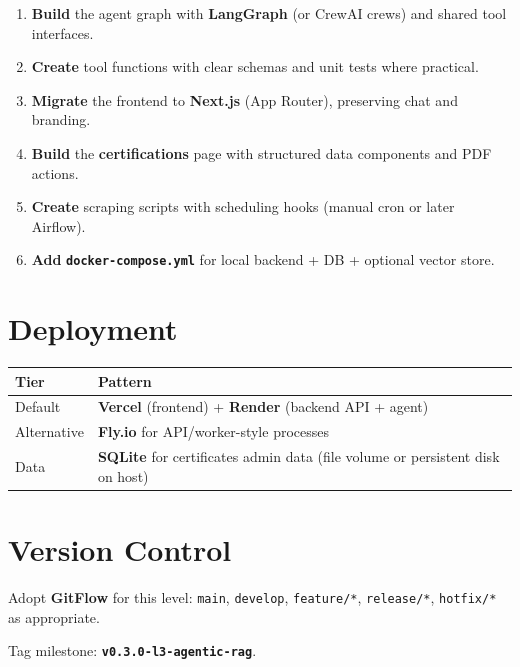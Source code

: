 \documentclass{article}
\begin{document}
\begin{enumerate}[leftmargin=*]
  \item \textbf{Build} the agent graph with \textbf{LangGraph} (or CrewAI crews) and shared tool interfaces.
  \item \textbf{Create} tool functions with clear schemas and unit tests where practical.
  \item \textbf{Migrate} the frontend to \textbf{Next.js} (App Router), preserving chat and branding.
  \item \textbf{Build} the \textbf{certifications} page with structured data components and PDF actions.
  \item \textbf{Create} scraping scripts with scheduling hooks (manual cron or later Airflow).
  \item \textbf{Add} \textbf{\texttt{docker-compose.yml}} for local backend + DB + optional vector store.
\end{enumerate}

\section{Deployment}

\begin{tabular}{@{}lp{7cm}@{}}
\toprule
\textbf{Tier} & \textbf{Pattern} \\
\midrule
Default & \textbf{Vercel} (frontend) + \textbf{Render} (backend API + agent) \\
Alternative & \textbf{Fly.io} for API/worker-style processes \\
Data & \textbf{SQLite} for certificates admin data (file volume or persistent disk on host) \\
\bottomrule
\end{tabular}

\section{Version Control}

Adopt \textbf{GitFlow} for this level: \texttt{main}, \texttt{develop}, \texttt{feature/*}, \texttt{release/*}, \texttt{hotfix/*} as appropriate.

Tag milestone: \textbf{\texttt{v0.3.0-l3-agentic-rag}}.
\end{document}

